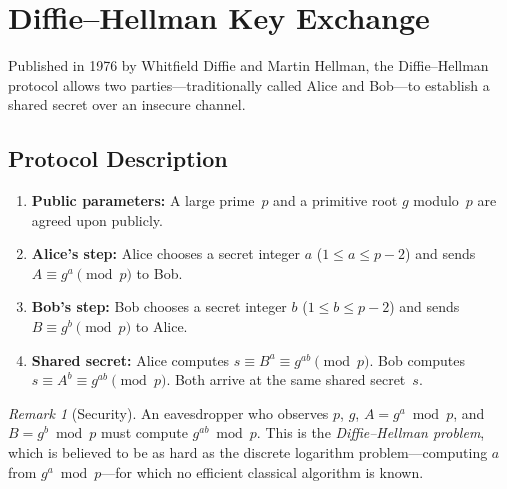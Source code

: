 \documentclass[12pt,a4paper,openany]{book}
\theoremstyle{definition}
\theoremstyle{plain}
\theoremstyle{remark}
\newtheorem{remark}[definition]{Remark}
\begin{document}
\section{Diffie--Hellman Key Exchange}
\label{sec:diffie-hellman}

Published in 1976 by Whitfield Diffie and Martin
Hellman, the Diffie--Hellman protocol allows two
parties---traditionally called Alice and Bob---to
establish a shared secret over an insecure channel.

\subsection{Protocol Description}
\label{subsec:dh-protocol}

\begin{enumerate}
  \item \textbf{Public parameters:} A large prime~$p$ and a primitive root
        $g$ modulo~$p$ are agreed upon publicly.
  \item \textbf{Alice's step:} Alice chooses a secret integer $a$
        ($1 \le a \le p-2$) and sends $A \equiv g^a \pmod{p}$ to Bob.
  \item \textbf{Bob's step:} Bob chooses a secret integer $b$
        ($1 \le b \le p-2$) and sends $B \equiv g^b \pmod{p}$ to Alice.
  \item \textbf{Shared secret:} Alice computes $s \equiv B^a \equiv g^{ab}
        \pmod{p}$.  Bob computes $s \equiv A^b \equiv g^{ab} \pmod{p}$.
        Both arrive at the same shared secret~$s$.
\end{enumerate}

\begin{remark}[Security]
\label{rem:dh-security}
An eavesdropper who observes $p$, $g$, $A = g^a \bmod p$, and $B = g^b \bmod p$
must compute $g^{ab} \bmod p$.  This is the
\emph{Diffie--Hellman problem},
which is believed to be as hard as the discrete logarithm problem---computing
$a$ from $g^a \bmod p$---for which no efficient classical algorithm is known.
\end{remark}
\end{document}
